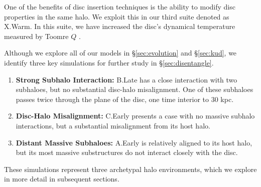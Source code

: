 One of the benefits of disc insertion techniques is the ability to modify disc properties in the same halo. We exploit this in our third suite denoted as X.Warm. In this suite, we have increased the disc's dynamical temperature measured by Toomre $Q$ \citep{toomre_q}.

Although we explore all of our models in \S\ref{sec:evolution} and \S\ref{sec:kud}, we identify three key simulations for further study in \S\ref{sec:disentangle}.
\begin{enumerate}
\item \textbf{Strong Subhalo Interaction:} B.Late has a close interaction with two subhaloes, but no substantial disc-halo misalignment. One of these subhaloes passes twice through the plane of the disc, one time interior to 30 kpc.
\item \textbf{Disc-Halo Misalignment:} C.Early presents a case with no massive subhalo interactions, but a substantial misalignment from its host halo.
\item \textbf{Distant Massive Subhaloes:} A.Early is relatively aligned to its host halo, but its most massive substructures do not interact closely with the disc.
\end{enumerate}
These simulations represent three archetypal halo environments, which we explore in more detail in subsequent sections.



